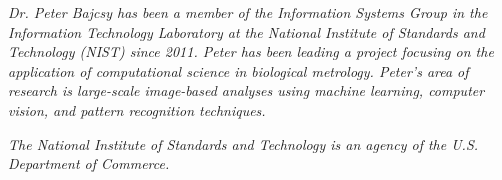 \documentclass[10pt, indentfirst]{article}
\begin{document}
\noindent\textit{Dr. Peter Bajcsy has been a member of the Information Systems Group in the Information Technology Laboratory at the National Institute of Standards and Technology (NIST) since 2011. Peter has been leading a project focusing on the application of computational science in biological metrology. Peter’s area of research is large-scale image-based analyses using machine learning, computer vision, and pattern recognition techniques.}

\noindent\textit{The National Institute of Standards and Technology is an agency of the U.S. Department of Commerce.} \\
\end{document}
